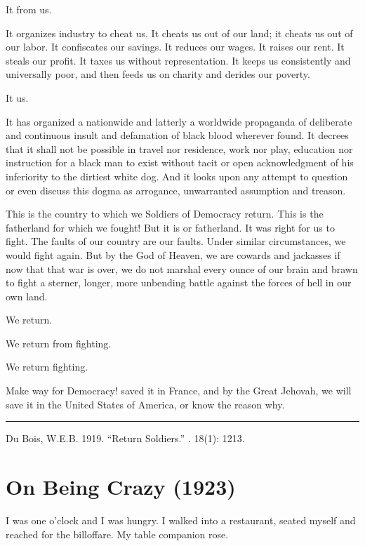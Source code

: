 \documentclass[letterpaper,10pt,english]{jupyterBook}
\begin{document}
\sphinxAtStartPar
It  from us.

\sphinxAtStartPar
It organizes industry to cheat us. It cheats us out of our land; it cheats us out of our labor. It confiscates our savings. It reduces our wages. It raises our rent. It steals our profit. It taxes us without representation. It keeps us consistently and universally poor, and then feeds us on charity and derides our poverty.

\sphinxAtStartPar
It  us.

\sphinxAtStartPar
It has organized a nation\sphinxhyphen{}wide and latterly a world\sphinxhyphen{}wide propaganda of deliberate and continuous insult and defamation of black blood wherever found. It decrees that it shall not be possible in travel nor residence, work nor play, education nor instruction for a black man to exist without tacit or open acknowledgment of his inferiority to the dirtiest white dog. And it looks upon any attempt to question or even discuss this dogma as arrogance, unwarranted assumption and treason.

\sphinxAtStartPar
This is the country to which we Soldiers of Democracy return. This is the fatherland for which we fought! But it is or fatherland. It was right for us to fight. The faults of our country are our faults. Under similar circumstances, we would fight again. But by the God of Heaven, we are cowards and jackasses if now that that war is over, we do not marshal every ounce of our brain and brawn to fight a sterner, longer, more unbending battle against the forces of hell in our own land.

\sphinxAtStartPar
We return.

\sphinxAtStartPar
We return from fighting.

\sphinxAtStartPar
We return fighting.

\sphinxAtStartPar
Make way for Democracy! saved it in France, and by the Great Jehovah, we will save it in the United States of America, or know the reason why.


\bigskip\hrule\bigskip


\sphinxAtStartPar
{} Du Bois, W.E.B. 1919. “Return Soldiers.” . 18(1): 12\sphinxhyphen{}13.


\section{On Being Crazy (1923)}
\label{\detokenize{Volumes/26/02/on_being_crazy:on-being-crazy-1923}}\label{\detokenize{Volumes/26/02/on_being_crazy::doc}}
\sphinxAtStartPar
I was one o’clock and I was hungry. I walked into a restaurant, seated myself and reached for the bill\sphinxhyphen{}of\sphinxhyphen{}fare. My table companion rose.
\end{document}
